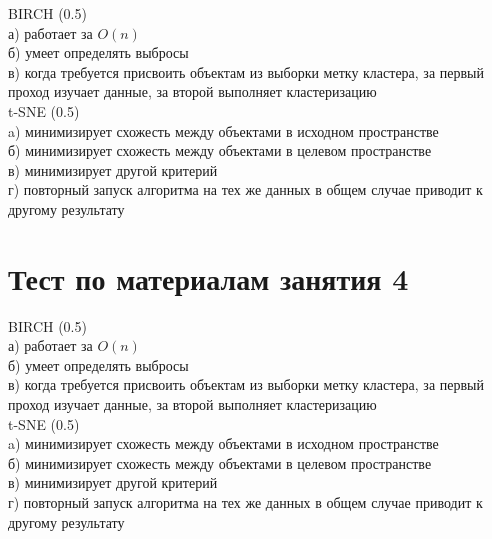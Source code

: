 \documentclass[10pt,a4paper]{article}
\begin{document}
BIRCH (0.5) \\
а) работает за $O(n)$ \\
б) умеет определять выбросы \\
в) когда требуется присвоить объектам из выборки метку кластера, за первый проход изучает данные, за второй выполняет кластеризацию \\

\noindent t-SNE (0.5) \\
a) минимизирует схожесть между объектами в исходном пространстве \\
б) минимизирует схожесть между объектами в целевом пространстве \\
в) минимизирует другой критерий \\
г) повторный запуск алгоритма на тех же данных в общем случае приводит к другому результату \\

\section*{Тест по материалам занятия 4}

BIRCH (0.5) \\
а) работает за $O(n)$ \\
б) умеет определять выбросы \\
в) когда требуется присвоить объектам из выборки метку кластера, за первый проход изучает данные, за второй выполняет кластеризацию \\

\noindent t-SNE (0.5) \\
a) минимизирует схожесть между объектами в исходном пространстве \\
б) минимизирует схожесть между объектами в целевом пространстве \\
в) минимизирует другой критерий \\
г) повторный запуск алгоритма на тех же данных в общем случае приводит к другому результату \\
\end{document}

